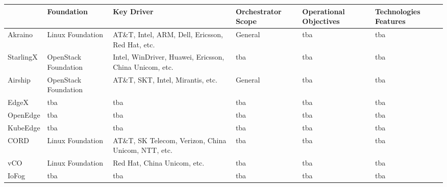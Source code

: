 \begin{turn}{90}
    \begin{tabular}{ | m{1cm} | m{1cm} | m{1cm} | m{1cm} | m{1cm} | }
    \hline
      & Foundation & Key Driver & Orchestrator Scope & Operational Objectives & Technologies Features\\ \hline
    Akraino & Linux Foundation & AT\&T, Intel, ARM, Dell, Ericsson, Red Hat, etc. & General & tba & tba \\ \hline

    StarlingX & OpenStack Foundation & Intel, WinDriver, Huawei, Ericsson, China Unicom, etc. & tba & tba & tba \\ \hline

    Airship & OpenStack Foundation &  AT\&T, SKT, Intel, Mirantis, etc. & General & tba & tba \\ \hline

    EdgeX & tba & tba & tba & tba & tba \\ \hline

    OpenEdge & tba & tba & tba & tba & tba \\ \hline

    KubeEdge & tba & tba & tba & tba & tba \\ \hline

    CORD & Linux Foundation & AT\&T, SK Telecom, Verizon, China Unicom, NTT, etc. & tba & tba & tba \\ \hline

    vCO & Linux Foundation & Red Hat, China Unicom, etc. & tba & tba & tba \\ \hline

    IoFog & tba & tba & tba & tba & tba \\ \hline
    
    \end{tabular}
\end{turn}

